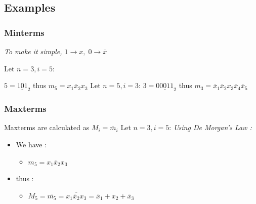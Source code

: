 \documentclass[12pt,openany]{book}
\begin{document}
			      	\vspace*{-10px}
			      	\subsection{Examples}
			      	\subsubsection*{Minterms}
			      	\textit{To make it simple, $1 \rightarrow x, \; 0 \rightarrow \overline{x} $} \newline
			      	
			      	Let $ n = 3, i = 5$:\newline
			      	
			      	$ 5 = \underline{101}_2$
			      	thus $m_5 = x_1 \overline{x}_2 x_3$ \newline
			      	Let $n=5, i=3$:\newline
			      	$ 3 = \underline{00011}_2$
			      	thus $m_3 = \overline{x}_1 \overline{x}_2 x_3 \overline{x}_4 \overline{x}_5$ \newline
			      	
			      	\newpage
			      	\subsubsection{Maxterms}
			      	Maxterms are calculated as $M_i = \overline{m}_i$ \newline
			      	Let $ n = 3, i = 5$:
			      	\newline \textit{Using De Morgan's Law :}
			      	\begin{itemize}
			      		\item[]We have :
			      		      \begin{itemize}
			      		      	\item[] $m_5 = x_1 \overline{x}_2 x_3$
			      		      \end{itemize}
			      		\item[]thus :
			      		      \begin{itemize}
			      		      	\item[] $M_5 = \overline{m_5} =  \overline{x_1 \overline{x}_2 x_3} = \overline{x}_1 + x_2 + \overline{x}_3$ \newline
			      		      \end{itemize}
			      	\end{itemize}
			      	
\end{document}
